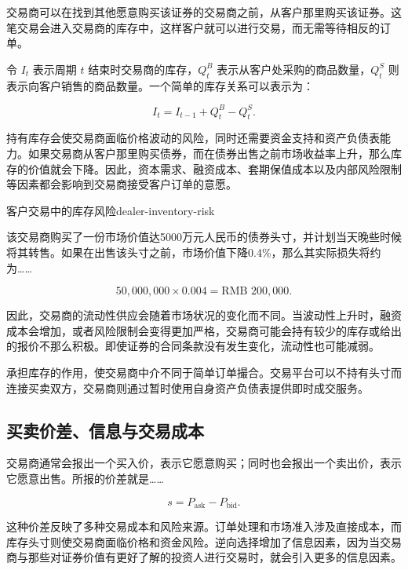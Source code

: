 交易商可以在找到其他愿意购买该证券的交易商之前，从客户那里购买该证券。这笔交易会进入交易商的库存中，这样客户就可以进行交易，而无需等待相反的订单。

令 $I_t$ 表示周期 $t$ 结束时交易商的库存，$Q_t^{B}$ 表示从客户处采购的商品数量，$Q_t^{S}$ 则表示向客户销售的商品数量。一个简单的库存关系可以表示为：

\begin{equation}
I_t=I_{t-1}+Q_t^{B}-Q_t^{S}.
\label{eq:ch13-dealer-inventory}
\end{equation}

持有库存会使交易商面临价格波动的风险，同时还需要资金支持和资产负债表能力。如果交易商从客户那里购买债券，而在债券出售之前市场收益率上升，那么库存的价值就会下降。因此，资本需求、融资成本、套期保值成本以及内部风险限制等因素都会影响到交易商接受客户订单的意愿。

\begin{example}{客户交易中的库存风险}{dealer-inventory-risk}

该交易商购买了一份市场价值达5000万元人民币的债券头寸，并计划当天晚些时候将其转售。如果在出售该头寸之前，市场价值下降0.4\%，那么其实际损失将约为……

\[
50{,}000{,}000\times 0.004=\text{RMB }200{,}000.
\]

\end{example}

因此，交易商的流动性供应会随着市场状况的变化而不同。当波动性上升时，融资成本会增加，或者风险限制会变得更加严格，交易商可能会持有较少的库存或给出的报价不那么积极。即使证券的合同条款没有发生变化，流动性也可能减弱。

承担库存的作用，使交易商中介不同于简单订单撮合。交易平台可以不持有头寸而连接买卖双方，交易商则通过暂时使用自身资产负债表提供即时成交服务。

\subsection[买卖价差、信息与交易成本]
{买卖价差、信息与交易成本}

交易商通常会报出一个买入价，表示它愿意购买；同时也会报出一个卖出价，表示它愿意出售。所报的价差就是……

\begin{equation}
s=P_{\mathrm{ask}}-P_{\mathrm{bid}}.
\label{eq:ch13-dealer-spread}
\end{equation}

这种价差反映了多种交易成本和风险来源。订单处理和市场准入涉及直接成本，而库存头寸则使交易商面临价格和资金风险。逆向选择增加了信息因素，因为当交易商与那些对证券价值有更好了解的投资人进行交易时，就会引入更多的信息因素。

